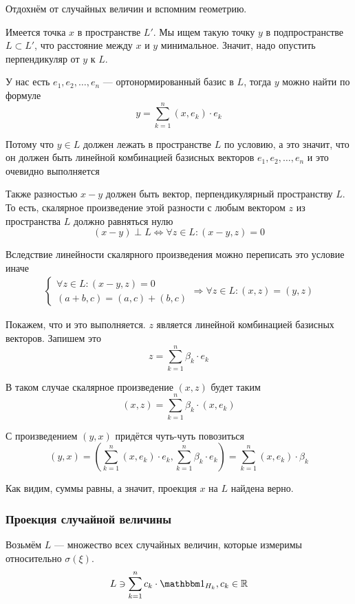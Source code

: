 Отдохнём от случайных величин и вспомним геометрию.

Имеется точка $x$ в пространстве $L'$.
Мы ищем такую точку $y$ в подпространстве $L\subset L'$,
что расстояние между $x$ и $y$ минимальное.
Значит, надо опустить перпендикуляр от $y$ к $L$.

У нас есть $e_1, e_2, \dots, e_n$ --- ортонормированный базис в $L$,
тогда $y$ можно найти по формуле
\begin{equation}\label{vectorProjection}
    y = \sum_{k=1}^n \left( x, e_k \right) \cdot e_k
\end{equation}

Потому что $y \in L$ должен лежать в пространстве $L$ по условию,
а это значит, что он должен быть линейной комбинацией базисных векторов
$e_1, e_2, \dots, e_n$ и это очевидно выполняется

Также разностью $x-y$ должен быть вектор, перпендикулярный пространству $L$.
То есть, скалярное произведение этой разности с любым вектором $z$
из пространства $L$ должно равняться нулю
$$\left( x-y \right) \perp L
    \Leftrightarrow \forall z \in L:
    \left( x-y,z \right)=0$$

Вследствие линейности скалярного произведения можно переписать это условие иначе
\begin{align*}
    \begin{cases}
        \forall z \in L: \left( x-y,z \right)=0\\
        \left( a+b,c \right)=\left( a,c \right)+\left( b,c \right)
    \end{cases}
    \Rightarrow \forall z \in L: \left( x,z \right)=\left( y,z \right)
\end{align*}

Покажем, что и это выполняется.
$z$ является линейной комбинацией базисных векторов. Запишем это
$$z = \sum_{k=1}^n \beta_k\cdot e_k$$

В таком случае скалярное произведение $\left( x,z \right)$ будет таким
$$\left( x,z \right)=\sum_{k=1}^n \beta_k\cdot \left( x,e_k \right)$$

С произведением $\left( y,x \right)$ придётся чуть-чуть повозиться
$$\left( y,x \right)
    =\left( \sum_{k=1}^n\left( x,e_k \right)\cdot e_k,
        \sum_{k=1}^n \beta_k\cdot e_k \right)
    =\sum_{k=1}^n \left( x,e_k \right)\cdot\beta_k$$

Как видим, суммы равны, а значит, проекция $x$ на $L$ найдена верно.

\subsubsection{Проекция случайной величины}
Возьмём $L$ --- множество всех случайных величин, которые
измеримы относительно $\sigma\left( \xi \right)$.
$$L \ni \sum_{k=1}^n c_k \cdot \indicatorof{H_k}, c_k \in \mathbb{R}$$

